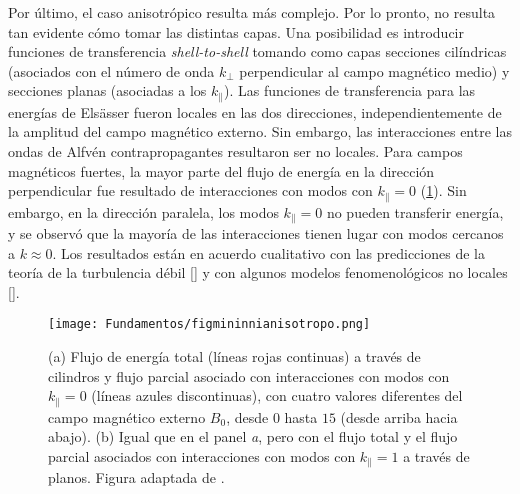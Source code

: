 Por último, el caso anisotrópico resulta más complejo. Por lo pronto,
no resulta tan evidente cómo tomar las distintas capas. Una
posibilidad es introducir funciones de transferencia
\textit{shell-to-shell} tomando como capas secciones cilíndricas
(asociados con el número de onda $k_\perp$ perpendicular al campo
magnético medio) y secciones planas (asociadas a los
$k_\parallel$). Las funciones de transferencia para las energías de
Els\"asser fueron locales en las dos direcciones, independientemente
de la amplitud del campo magnético externo. Sin embargo, las
interacciones entre las ondas de Alfv\'en contrapropagantes resultaron
ser no locales. Para campos magnéticos fuertes, la mayor parte del
flujo de energía en la dirección perpendicular fue resultado de
interacciones con modos con $k_\parallel = 0$
(\cref{fig:mininnianisotropo}). Sin embargo, en la dirección paralela,
los modos $k_\parallel = 0$ no pueden transferir energía, y se observó
que la mayoría de las interacciones tienen lugar con modos cercanos a
$k \approx 0$. Los resultados están en acuerdo cualitativo con las
predicciones de la teoría de la turbulencia débil
[\cite{galtier_weak_2000}] y con algunos modelos fenomenológicos no
locales [\cite{alexakis_nonlocal_2007}].
\begin{figure}[h!]
  \centering
  \texttt{[image: Fundamentos/figmininnianisotropo.png]}
  \caption{(a) Flujo de energía total (líneas rojas continuas) a
    través de cilindros y flujo parcial asociado con interacciones con
    modos con $k_\parallel = 0$ (líneas azules discontinuas), con
    cuatro valores diferentes del campo magnético externo $B_0$, desde
    $0$ hasta $15$ (desde arriba hacia abajo). (b) Igual que en el
    panel \emph{a}, pero con el flujo total y el flujo parcial
    asociados con interacciones con modos con $k_\parallel = 1$ a
    través de planos. Figura adaptada de
    \cite{alexakis_anisotropic_2007}.}
  \label{fig:mininnianisotropo}
\end{figure}

